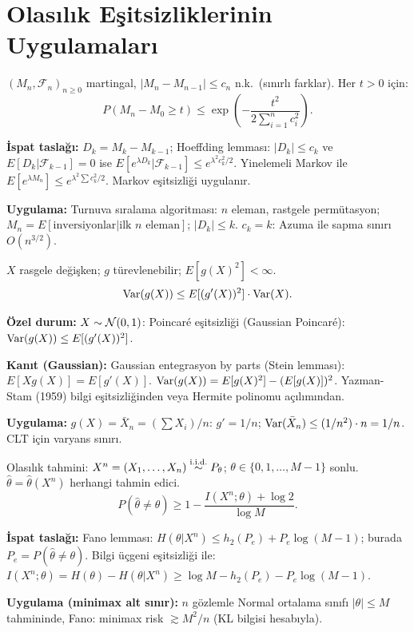 \section{Olasılık Eşitsizliklerinin Uygulamaları}
\label{app:esitsizlik_uyg}

\begin{ornek}
$(M_n,\mathcal{F}_n)_{n\geq0}$ martingal, $|M_n-M_{n-1}|\leq c_n$ n.k.\ (sınırlı farklar).
Her $t>0$ için:
\[
  P(M_n-M_0\geq t) \leq \exp\!\left(-\frac{t^2}{2\sum_{i=1}^n c_i^2}\right).
\]

\textbf{İspat taslağı:} $D_k=M_k-M_{k-1}$; Hoeffding lemması: $|D_k|\leq c_k$ ve $E[D_k|\mathcal{F}_{k-1}]=0$ ise $E[e^{\lambda D_k}|\mathcal{F}_{k-1}]\leq e^{\lambda^2c_k^2/2}$. Yinelemeli Markov ile $E[e^{\lambda M_n}]\leq e^{\lambda^2\sum c_k^2/2}$. Markov eşitsizliği uygulanır.

\textbf{Uygulama:} Turnuva sıralama algoritması: $n$ eleman, rastgele permütasyon; $M_n=E[\text{inversiyonlar}|\text{ilk }n\text{ eleman}]$; $|D_k|\leq k$. $c_k=k$: Azuma ile sapma sınırı $O(n^{3/2})$.
\end{ornek}

\begin{ornek}
$X$ rasgele değişken; $g$ türevlenebilir; $E[g(X)^2]<\infty$.
\[
  \operatorname{Var}(g(X)) \leq E[(g'(X))^2]\cdot\operatorname{Var}(X).
\]

\textbf{Özel durum:} $X\sim\mathcal{N}(0,1)$: Poincaré eşitsizliği (Gaussian Poincaré):
$\operatorname{Var}(g(X))\leq E[(g'(X))^2]$.

\textbf{Kanıt (Gaussian):} Gaussian entegrasyon by parts (Stein lemması): $E[Xg(X)]=E[g'(X)]$.
$\operatorname{Var}(g(X))=E[g(X)^2]-(E[g(X)])^2$. Yazman-Stam (1959) bilgi eşitsizliğinden veya Hermite polinomu açılımından.

\textbf{Uygulama:} $g(X)=\bar X_n=(\sum X_i)/n$: $g'=1/n$; $\operatorname{Var}(\bar X_n)\leq (1/n^2)\cdot n=1/n$. CLT için varyans sınırı.
\end{ornek}

\begin{ornek}
Olasılık tahmini: $X^n=(X_1,\ldots,X_n)\overset{\text{i.i.d.}}{\sim} P_\theta$; $\theta\in\{0,1,\ldots,M-1\}$ sonlu. $\hat\theta=\hat\theta(X^n)$ herhangi tahmin edici.
\[
  P(\hat\theta\neq\theta) \geq 1 - \frac{I(X^n;\theta)+\log 2}{\log M}.
\]

\textbf{İspat taslağı:} Fano lemması: $H(\theta|X^n)\leq h_2(P_e)+P_e\log(M-1)$; burada $P_e=P(\hat\theta\neq\theta)$. Bilgi üçgeni eşitsizliği ile: $I(X^n;\theta)=H(\theta)-H(\theta|X^n)\geq\log M-h_2(P_e)-P_e\log(M-1)$.

\textbf{Uygulama (minimax alt sınır):} $n$ gözlemle Normal ortalama sınıfı $|\theta|\leq M$ tahmininde, Fano: minimax risk $\gtrsim M^2/n$ (KL bilgisi hesabıyla).
\end{ornek}

